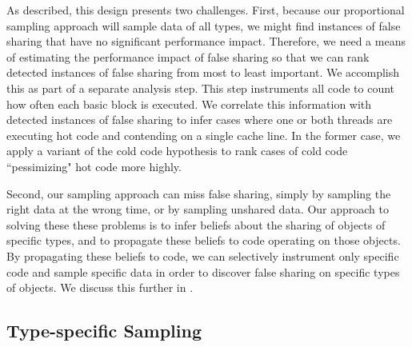 \documentclass{sig-alternate}
\newcommand{\Toolname}{DataReactor}
\begin{document}
As described, this design presents two challenges. First, because our proportional sampling approach will sample
data of all types, we might find instances of false sharing that have no significant performance impact. Therefore,
we need a means of estimating the performance impact of false sharing so that we can rank detected instances of
false sharing from most to least important. We accomplish this as part of a separate analysis step. This step
instruments all code to count how often each basic block is executed. We correlate this information with detected
instances of false sharing to infer cases where one or both threads are executing hot code and contending on a single
cache line. In the former case, we apply a variant of the cold code hypothesis \cite{LiteRace} to rank cases of cold
code ``pessimizing" hot code more highly.

Second, our sampling approach can miss false sharing, simply by sampling the right data at the wrong time, or by
sampling unshared data. Our approach to solving these these problems is to infer beliefs about the sharing of
objects of specific types, and to propagate these beliefs to code operating on those objects. By propagating these
beliefs to code, we can selectively instrument only specific code and sample specific data in order to discover
false sharing on specific types of objects. We discuss this further in .

\subsection{Type-specific Sampling}\label{sec:beliefs}

\end{document}
